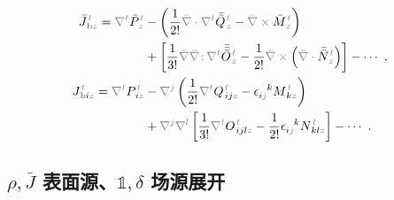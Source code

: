 \begin{subequations}
	\abovedisplayskip=6pt
\begin{align}
\bar{J}^{\;\!\mathcolor{gray}{t}}_{\;\!\textcolor{Maroon}{\text{b}}\mathcolor{gray}{z}} = \mathcolor{gray}{\nabla^t} \bar{P}^{\;\!\mathcolor{gray}{t}}_{\;\!\mathcolor{gray}{z}} &- \left( \frac{1}{2!} \mathcolor{gray}{\bar{\nabla} \cdot} \mathcolor{gray}{\nabla^t} \bar{\bar{Q}}^{\;\!\mathcolor{gray}{t}}_{\;\!\mathcolor{gray}{z}} - \mathcolor{gray}{\bar{\nabla} \times} \bar{M}^{\;\!\mathcolor{gray}{t}}_{\;\!\mathcolor{gray}{z}} \right) \label{eq:J-b} \\ &+ \left[ \frac{1}{3!} \mathcolor{gray}{\bar{\nabla}} \mathcolor{gray}{\bar{\nabla} \colon}\! \mathcolor{gray}{\nabla^t} \bar{\bar{\bar{O}}}^{\;\!\mathcolor{gray}{t}}_{\;\!\mathcolor{gray}{z}} - \frac{1}{2!} \mathcolor{gray}{\bar{\nabla} \times} \left( \mathcolor{gray}{\bar{\nabla} \cdot}  \bar{\bar{N}}^{\;\!\mathcolor{gray}{t}}_{\;\!\mathcolor{gray}{z}} \right) \right] - \cdots~, \\
J^{\;\!\mathcolor{gray}{t}}_{\;\!\textcolor{Maroon}{\text{b}} i \mathcolor{gray}{z}} = \mathcolor{gray}{\nabla^t} P^{\;\!\mathcolor{gray}{t}}_{\;\! i\mathcolor{gray}{z}} &- \mathcolor{gray}{\nabla^j} \left( \frac{1}{2!} \mathcolor{gray}{\nabla^t} Q^{\;\!\mathcolor{gray}{t}}_{\;\! ij\mathcolor{gray}{z}} - \epsilon^{\hphantom{ij}k}_{i\mathcolor{gray}{j}} M^{\;\!\mathcolor{gray}{t}}_{\;\! k\mathcolor{gray}{z}} \right) \label{eq:j-b} \\ &+ \mathcolor{gray}{\nabla^j} \mathcolor{gray}{\nabla^l} \left[ \frac{1}{3!}  \mathcolor{gray}{\nabla^t} O^{\;\!\mathcolor{gray}{t}}_{\;\! ijl\mathcolor{gray}{z}} - \frac{1}{2!} \epsilon^{\hphantom{ij}k}_{i\mathcolor{gray}{j}} N^{\;\!\mathcolor{gray}{t}}_{\;\! kl\mathcolor{gray}{z}} \right] - \cdots~.
\end{align}
\end{subequations}

\clearpage
\vspace*{-7.5em}

\subsection{${\rho}, \bar{J}$ 表面源、${\mathbb{1}},\delta$ 场源展开}\label{ssec:step-delta}


